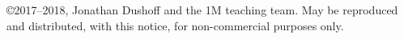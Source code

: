 \copyright 2017--2018, Jonathan Dushoff and the 1M teaching team.  May be reproduced and distributed, with this notice, for non-commercial purposes only.
